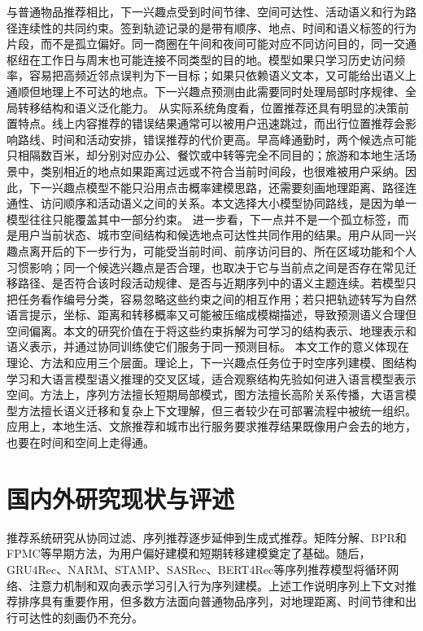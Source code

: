 与普通物品推荐相比，下一兴趣点受到时间节律、空间可达性、活动语义和行为路径连续性的共同约束\cite{PRME,ST-RNN,HST-LSTM,STAN,GETNext}。签到轨迹记录的是带有顺序、地点、时间和语义标签的行为片段，而不是孤立偏好。同一商圈在午间和夜间可能对应不同访问目的，同一交通枢纽在工作日与周末也可能连接不同类型的目的地。模型如果只学习历史访问频率，容易把高频近邻点误判为下一目标；如果只依赖语义文本，又可能给出语义上通顺但地理上不可达的地点。下一兴趣点预测由此需要同时处理局部时序规律、全局转移结构和语义泛化能力。
从实际系统角度看，位置推荐还具有明显的决策前置特点。线上内容推荐的错误结果通常可以被用户迅速跳过，而出行位置推荐会影响路线、时间和活动安排，错误推荐的代价更高。早高峰通勤时，两个候选点可能只相隔数百米，却分别对应办公、餐饮或中转等完全不同目的；旅游和本地生活场景中，类别相近的地点如果距离过远或不符合当前时间段，也很难被用户采纳。因此，下一兴趣点模型不能只沿用点击概率建模思路，还需要刻画地理距离、路径连通性、访问顺序和活动语义之间的关系。本文选择大小模型协同路线，是因为单一模型往往只能覆盖其中一部分约束。
进一步看，下一点并不是一个孤立标签，而是用户当前状态、城市空间结构和候选地点可达性共同作用的结果。用户从同一兴趣点离开后的下一步行为，可能受当前时间、前序访问目的、所在区域功能和个人习惯影响；同一个候选兴趣点是否合理，也取决于它与当前点之间是否存在常见迁移路径、是否符合该时段活动规律、是否与近期序列中的语义主题连续。若模型只把任务看作编号分类，容易忽略这些约束之间的相互作用；若只把轨迹转写为自然语言提示，坐标、距离和转移概率又可能被压缩成模糊描述，导致预测语义合理但空间偏离。本文的研究价值在于将这些约束拆解为可学习的结构表示、地理表示和语义表示，并通过协同训练使它们服务于同一预测目标。
本文工作的意义体现在理论、方法和应用三个层面。理论上，下一兴趣点任务位于时空序列建模、图结构学习和大语言模型语义推理的交叉区域\cite{zhang2023sequentialsurvey,wu2022gnnrecsurvey,cao2024trajllm,li2024spatialfm,gao2023llm4rs}，适合观察结构先验如何进入语言模型表示空间。方法上，序列方法擅长短期局部模式\cite{hidasi2016gru4rec,li2017narm,liu2018stamp,hidasi2018gru4rec2,qin2020fmlp}，图方法擅长高阶关系传播\cite{ying2018pin,wu2019session,he2020lightgcn,wang2019kgat,lin2022simgcl}，大语言模型方法擅长语义迁移和复杂上下文理解\cite{LLMRec,CoLLM,CoRAL,LLaRA,GraphGPT}，但三者较少在可部署流程中被统一组织。应用上，本地生活、文旅推荐和城市出行服务要求推荐结果既像用户会去的地方，也要在时间和空间上走得通\cite{gao2022spatiotemporalsurvey,liu2023cn13,zheng2024cn14,wang2024georecllm,zheng2024poillm}。

\section{国内外研究现状与评述}
推荐系统研究从协同过滤、序列推荐逐步延伸到生成式推荐。矩阵分解\cite{koren2009matrix}、BPR\cite{rendle2009bpr}和FPMC\cite{FPMC}等早期方法，为用户偏好建模和短期转移建模奠定了基础。随后，GRU4Rec\cite{hidasi2016gru4rec}、NARM\cite{li2017narm}、STAMP\cite{liu2018stamp}、SASRec\cite{kang2018sasrec}、BERT4Rec\cite{sun2019bert4rec}等序列推荐模型将循环网络、注意力机制和双向表示学习引入行为序列建模。上述工作说明序列上下文对推荐排序具有重要作用，但多数方法面向普通物品序列，对地理距离、时间节律和出行可达性的刻画仍不充分。

